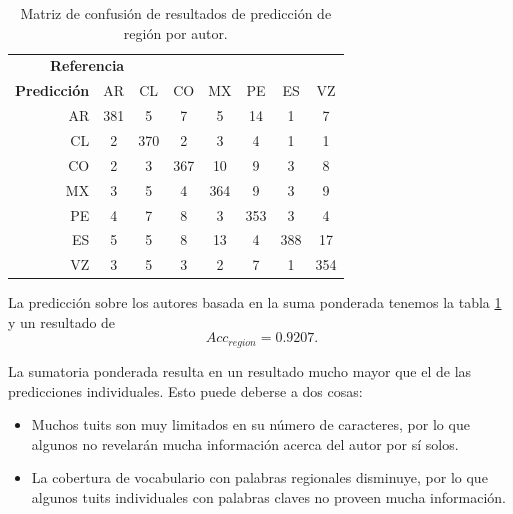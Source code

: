 \begin{table}
\centering
\begin{tabular}{r| c c c c c c c}
\multicolumn{3}{c}{\textbf{Referencia}} \\
\textbf{Predicción} & AR & CL & CO & MX & PE & ES & VZ\\
\hline
AR & 381 & 5 & 7 & 5 & 14 & 1 & 7 \\
CL & 2 & 370 & 2 & 3 & 4 & 1 & 1 \\
CO & 2 & 3 & 367 & 10 & 9 & 3 & 8 \\
MX & 3 & 5 & 4 & 364 & 9 & 3 & 9 \\
PE & 4 & 7 & 8 & 3 & 353 & 3 & 4 \\
ES & 5 & 5 & 8 & 13 & 4 & 388 & 17 \\
VZ & 3 & 5 & 3 & 2 & 7 & 1 & 354 \\
\end{tabular}
\caption{Matriz de confusión de resultados de predicción de región por autor.}
\label{tab:region_authtweet}
\end{table}

La predicción sobre los autores basada en la suma ponderada tenemos la tabla \ref{tab:region_authtweet} y un resultado de
\[ \phantom{.}Acc_{region} = 0\text{.}9207. \]

La sumatoria ponderada resulta en un resultado mucho mayor que el de las predicciones individuales. Esto puede deberse a dos cosas:

\begin{itemize}
\item Muchos tuits son muy limitados en su número de caracteres, por lo que algunos no revelarán mucha información acerca del autor por sí solos.
\item La cobertura de vocabulario con palabras regionales disminuye, por lo que algunos tuits individuales con palabras claves no proveen mucha información.
\end{itemize}

